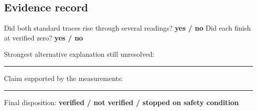 \subsection*{Evidence record}
\noindent Did both standard traces rise through several readings?
\textbf{yes / no}\hfill
Did each finish at verified zero? \textbf{yes / no}

\medskip
\noindent Strongest alternative explanation still unresolved:

\vspace{.8cm}
\hrule
\medskip
\noindent Claim supported by the measurements:

\vspace{.8cm}
\hrule
\medskip
\noindent Final disposition:
\textbf{verified / not verified / stopped on safety condition}


